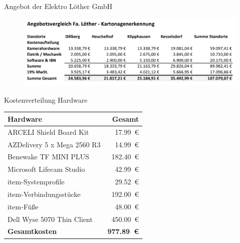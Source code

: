 \documentclass[10pt,ngerman]{beamer}
\begin{document}
\begin{frame}[fragile]{Angebot der Elektro Löther GmbH}
  \begin{figure}[htpb]
    \centering
    \includegraphics[width=1\textwidth]{pics/AngebotLoether.png}
  \end{figure}
\end{frame}



\begin{frame}[fragile]{Kostenverteilung Hardware}
  \begin{table}[htbp]
    \centering
    \begin{tabular}{lr}
      \textbf{Hardware}           & \textbf{Gesamt}         \\ \hline
      ARCELI Shield Board Kit     & \SI{17.99}{€}           \\
      AZDelivery 5 x Mega 2560 R3 & \SI{14.99}{€}           \\
      Benewake TF MINI PLUS       & \SI{182.40}{€}          \\
      Microsoft Lifecam Studio    & \SI{42.99}{€}           \\
      item-Systemprofile          & \SI{29.52}{€}           \\
      item-Verbindungsstücke      & \SI{192.00}{€}          \\
      item-Füße                   & \SI{48.00}{€}           \\
      Dell Wyse 5070 Thin Client  & \SI{450.00}{€}          \\
      \hline
      \textbf{Gesamtkosten}       & \textbf{\SI{977.89}{€}}
    \end{tabular}
  \end{table}
\end{frame}
\end{document}
